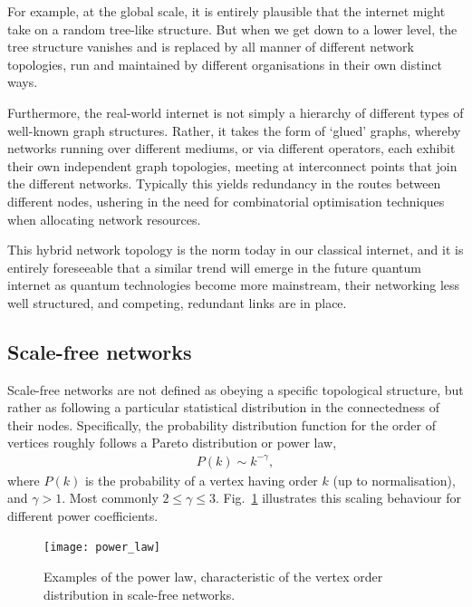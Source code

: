 For example, at the global scale, it is entirely plausible that the internet might take on a random tree-like structure. But when we get down to a lower level, the tree structure vanishes and is replaced by all manner of different network topologies, run and maintained by different organisations in their own distinct ways.

Furthermore, the real-world internet is not simply a hierarchy of different types of well-known graph structures. Rather, it takes the form of `glued' graphs, whereby networks running over different mediums, or via different operators, each exhibit their own independent graph topologies, meeting at interconnect points that join the different networks. Typically this yields redundancy in the routes between different nodes, ushering in the need for combinatorial optimisation techniques when allocating network resources.

This hybrid network topology is the norm today in our classical internet, and it is entirely foreseeable that a similar trend will emerge in the future quantum internet as quantum technologies become more mainstream, their networking less well structured, and competing, redundant links are in place.

%
%

\subsection{Scale-free networks}\label{sec:scale_free_networks}

Scale-free networks are not defined as obeying a specific topological structure, but rather as following a particular statistical distribution in the connectedness of their nodes. Specifically, the probability distribution function for the order of vertices roughly follows a Pareto distribution or power law,
\begin{align}\label{eq:pareto_dist}
	P(k) \sim k^{-\gamma},
\end{align}
where $P(k)$ is the probability of a vertex having order $k$ (up to normalisation), and \mbox{$\gamma>1$}. Most commonly \mbox{$2\leq\gamma\leq 3$}. Fig.~\ref{fig:power_law} illustrates this scaling behaviour for different power coefficients.

\begin{figure}[!htbp]
\texttt{[image: power\_law]}
\caption{Examples of the power law, characteristic of the vertex order distribution in scale-free networks.}\label{fig:power_law}	
\end{figure}

